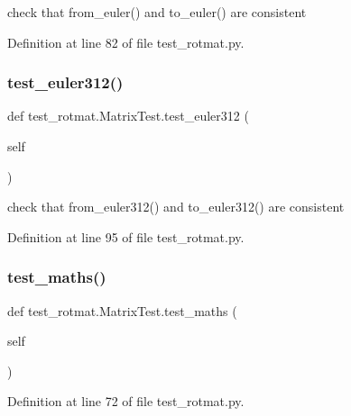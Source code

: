\begin{DoxyVerb}check that from_euler() and to_euler() are consistent\end{DoxyVerb}
 

Definition at line 82 of file test\+\_\+rotmat.\+py.

\mbox{\label{classtest__rotmat_1_1MatrixTest_a9ee7aff49ac9682b2ae4acc8b6a5424c}} 
\subsubsection{\texorpdfstring{test\_euler312()}{test\_euler312()}}
{\footnotesize\ttfamily def test\+\_\+rotmat.\+Matrix\+Test.\+test\+\_\+euler312 (\begin{DoxyParamCaption}\item[{}]{self }\end{DoxyParamCaption})}

\begin{DoxyVerb}check that from_euler312() and to_euler312() are consistent\end{DoxyVerb}
 

Definition at line 95 of file test\+\_\+rotmat.\+py.

\mbox{\label{classtest__rotmat_1_1MatrixTest_a31a4a587eae674aae8e1e40001864656}} 
\subsubsection{\texorpdfstring{test\_maths()}{test\_maths()}}
{\footnotesize\ttfamily def test\+\_\+rotmat.\+Matrix\+Test.\+test\+\_\+maths (\begin{DoxyParamCaption}\item[{}]{self }\end{DoxyParamCaption})}



Definition at line 72 of file test\+\_\+rotmat.\+py.

\mbox{\label{classtest__rotmat_1_1MatrixTest_a7ed2f1e8f790c38bfe120e9817e5a4fb}} 
